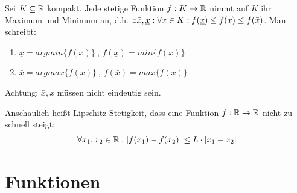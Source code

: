 \begin{satz}
	Sei $K \subseteq \mathbb{R}$ kompakt. Jede stetige Funktion $f : K \rightarrow \mathbb{R}$ nimmt auf $K$ ihr Maximum und Minimum an, d.h. $\exists \bar{x}, \underline{x}: \forall x \in K : f(\underline{x}) \leq f(x) \leq f(\bar{x})$. Man schreibt:
	
	\begin{enumerate}[noitemsep]
		\item $\underline{x} = argmin \{ f(x) \} \medspace$, $f(\underline{x}) = min \{f(x)\}$
		\item $\bar{x} = argmax \{ f(x) \} \medspace$, $f(\bar{x}) = max \{f(x)\}$
	\end{enumerate}

	Achtung: $\bar{x}, \underline{x}$ müssen nicht eindeutig sein.
\end{satz}

\begin{definition}
	Anschaulich heißt Lipschitz-Stetigkeit, dass eine Funktion $f : \mathbb{R} \rightarrow \mathbb{R}$ nicht zu schnell steigt:
	\begin{align*}
		\forall x_1, x_2 \in \mathbb{R} : |f(x_1) - f(x_2)| \leq L \cdot |x_1 - x_2|
	\end{align*}
\end{definition}
	
\section{Funktionen}


